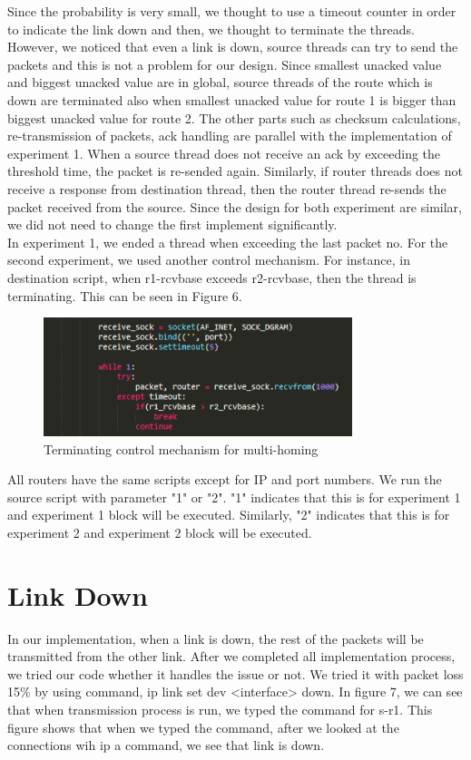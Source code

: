 \documentclass[conference]{IEEEtran}
\begin{document}
Since the probability is very small, we thought to use a timeout counter in order to indicate the link down and then, we thought to terminate the threads. However, we noticed that even a link is down, source threads can try to send the packets and this is not a problem for our design. Since smallest unacked value and biggest unacked value are in global, source threads of the route which is down are terminated also when smallest unacked value for route 1 is bigger than biggest unacked value for route 2. The other parts such as checksum calculations, re-transmission of packets, ack handling are parallel with the implementation of experiment 1. When a source thread does not receive an ack by exceeding the threshold time, the packet is re-sended again. Similarly, if router threads does not receive a response from destination thread, then the router thread re-sends the packet received from the source. Since the design for both experiment are similar, we did not need to change the first implement significantly. \\

In experiment 1, we ended a thread when exceeding the last packet no. For the second experiment, we used another control mechanism. For instance, in destination script, when r1-rcvbase exceeds r2-rcvbase, then the thread is terminating. This can be seen in Figure 6. \\

\begin{figure}[htp]
    \centering
    \includegraphics[width=9cm]{multihoming1.png}
    \caption{Terminating control mechanism for multi-homing}
    \label{fig:graph}
\end{figure}

All routers have the same scripts except for IP and port numbers. We run the source script with parameter "1" or "2". "1" indicates that this is for experiment 1 and experiment 1 block will be executed. Similarly, "2" indicates that this is for experiment 2 and experiment 2 block will be executed. \\

\section{Link Down}
In our implementation, when a link is down, the rest of the packets will be transmitted from the other link. After we completed all implementation process, we tried our code whether it handles the issue or not. We tried it with packet loss 15$\%$ by using command, ip link set dev <interface> down. In figure 7, we can see that when transmission process is run, we typed the command for s-r1. This figure shows that when we typed the command, after we looked at the connections wih ip a command, we see that link is down.
\end{document}
